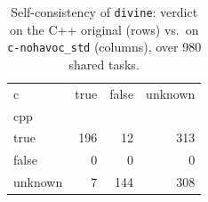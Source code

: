 \begin{table}[t]
  \centering
  \caption{Self-consistency of \texttt{divine}: verdict on the C++ original (rows) vs.\ on \texttt{c-nohavoc_std} (columns), over 980 shared tasks.}
  \label{tab:selfpair-divine-c-nohavoc_std}
\begin{tabular}{lrrr}
\toprule
c & true & false & unknown \\
cpp &  &  &  \\
\midrule
true & 196 & 12 & 313 \\
false & 0 & 0 & 0 \\
unknown & 7 & 144 & 308 \\
\bottomrule
\end{tabular}
\end{table}
